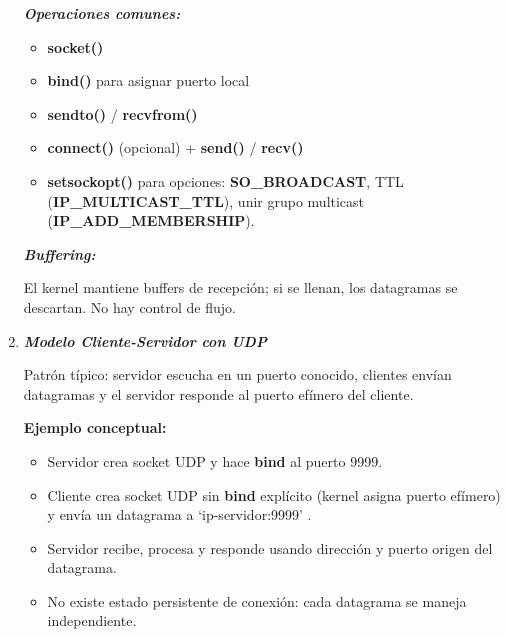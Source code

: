 \documentclass[12pt]{amsart}
\begin{document}
\begin{enumerate}
		\medskip \medskip	

		\noindent \textbf{\textit{Operaciones comunes:}}
		
		\medskip \medskip		

		\begin{itemize}
		\item \textbf{socket()}
		\item \textbf{bind()} para asignar puerto local
		\item \textbf{sendto()} / \textbf{recvfrom()}
		\item	\textbf{connect()} (opcional) + \textbf{send()} / \textbf{recv()}
		\item \textbf{setsockopt()} para opciones: \textbf{SO\_BROADCAST}, TTL (\textbf{IP\_MULTICAST\_TTL}), unir grupo multicast (\textbf{IP\_ADD\_MEMBERSHIP}).
		\end{itemize}
		
		\medskip \medskip

		\noindent \textbf{\textit{Buffering:}} 
		
		\medskip \medskip
		
		El kernel mantiene buffers de recepción; si se llenan, los datagramas se descartan. No hay control de flujo.

		\medskip \medskip
		
		\bigskip\bigskip
		
		\item \textbf{\textit{Modelo Cliente-Servidor con UDP}}
		
		\medskip
		Patrón típico: servidor escucha en un puerto conocido, clientes envían datagramas y el servidor responde al puerto efímero del cliente.
		
		\medskip \medskip

		\noindent \textbf{Ejemplo conceptual:}
		\medskip \medskip		
		\begin{itemize}
		\item Servidor crea socket UDP y hace \textbf{bind} al puerto 9999.
		\item Cliente crea socket UDP sin \textbf{bind} explícito (kernel asigna puerto efímero) y envía un datagrama a `ip-servidor:9999' .
		\item Servidor recibe, procesa y responde usando dirección y puerto origen del datagrama.
		\item	No existe estado persistente de conexión: cada datagrama se maneja independiente.
		\end{itemize}
		

\end{enumerate}
\end{document}
